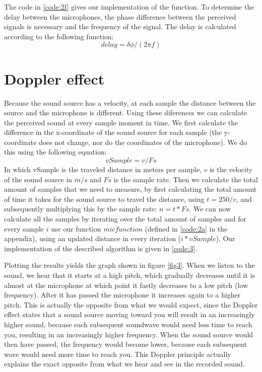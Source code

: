 \documentclass{article}
\begin{document}
The code in \autoref{code:2f} gives our implementation of the function. To determine the delay between the microphones, 
the phase difference between the perceived signals is necessary and the frequency of the signal. The delay is calculated 
according to the following function:
\begin{equation}
 delay = \delta \phi / (2\pi f)
\end{equation}

\section{Doppler effect}
Because the sound source has a velocity, at each sample the distance between the source and the microphone is different. Using these diferences we can calculate the perceived sound at every sample moment in time. We first calculate the difference in the x-coordinate of the sound source for each sample (the y-coordinate does not change, nor do the coordinates of the microphone). We do this using the following equation:
\begin{equation}
 vSample = v / Fs
\end{equation}
In which vSample is the traveled distance in meters per sample, $v$ is the velocity of the sound source in $m/s$ and $Fs$ is the sample rate. Then we calculate the total amount of samples that we need to measure, by first calculating the total amount of time it takes for the sound source to travel the distance, using $t = 250/v$, and subsequently multiplying this by the sample rate: $n = t * Fs$. We can now calculate all the samples by iterating over the total amount of samples and for every sample $i$ use our function $micfunction$ (defined in \autoref{code:2a} in the appendix), using an updated distance in every iteration ($i*vSample$). Our implementation of the described algorithm is given in \autoref{code:3}.

Plotting the results yields the graph shown in figure \ref{fig3}. When we listen to the sound, we hear that it starts at a high pitch, which gradually decreases until it is almost at the microphone at which point it fastly decreases to a low pitch (low frequency). After it has passed the microphone it increases again to a higher pitch. This is actually the opposite from what we would expect, since the Doppler effect states that a sound source moving toward you will result in an increasingly higher sound, because each subsequent soundwave would need less time to reach you, resulting in an increasingly higher frequency. When the sound source would then have passed, the frequency would become lower, because each subsequent wave would need more time to reach you. This Doppler principle actually explains the exact opposite from what we hear and see in the recorded sound.
\end{document}
